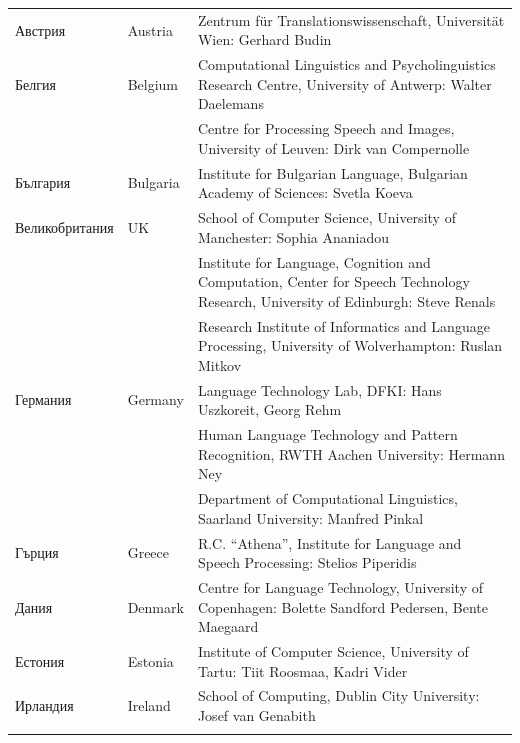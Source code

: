   \begin{longtable}{@{}llp{110mm}@{}}
    Австрия & \textcolor{grey1}{Austria} & Zentrum für
    Translationswissenschaft, Universität Wien: Gerhard Budin\\
    \addlinespace 
    Белгия & \textcolor{grey1}{Belgium} & Computational Linguistics and
    Psycholinguistics Research Centre, University of Antwerp: Walter
    Daelemans\\ \addlinespace
    & & Centre for Processing Speech and Images, University of Leuven:\newline
  Dirk van Compernolle \\ \addlinespace
    България & \textcolor{grey1}{Bulgaria} & Institute for Bulgarian
    Language, Bulgarian Academy of Sciences: Svetla Koeva \\
    \addlinespace
    Великобритания & \textcolor{grey1}{UK} & School of Computer Science, University of Manchester: Sophia Ananiadou \\ \addlinespace 
    & & Institute for Language, Cognition and Computation, Center for Speech Technology Research, University of Edinburgh: Steve Renals \\ \addlinespace 
    & & Research Institute of Informatics and Language Processing, University of Wolverhampton: Ruslan Mitkov \\ \addlinespace 
    Германия & \textcolor{grey1}{Germany} & Language Technology Lab, DFKI: Hans Uszkoreit, Georg Rehm\\ \addlinespace
    & & Human Language Technology and Pattern Recognition, RWTH Aachen University: Hermann Ney \\ \addlinespace
    & & Department of Computational Linguistics, Saarland University:
    Manfred Pinkal\\ \addlinespace 
    Гърция & \textcolor{grey1}{Greece} & R.C. “Athena”, Institute for Language and Speech Processing: Stelios Piperidis\\ \addlinespace
  Дания &  \textcolor{grey1}{Denmark} & Centre for Language Technology,
  University of Copenhagen: \newline Bolette Sandford Pedersen, Bente
  Maegaard\\ \addlinespace
    Естония & \textcolor{grey1}{Estonia} & Institute of Computer
    Science, University of Tartu: Tiit Roosmaa, Kadri Vider\\
    \addlinespace
    Ирландия & \textcolor{grey1}{Ireland} & School of Computing, Dublin City University: Josef van Genabith\\ \addlinespace

\end{longtable}
